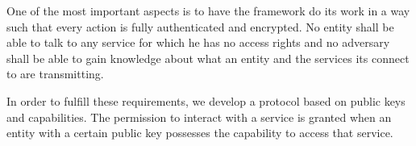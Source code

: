 One of the most important aspects is to have the framework do its work in a way such that every action is fully authenticated and encrypted.
No entity shall be able to talk to any service for which he has no access rights and no adversary shall be able to gain knowledge about what an entity and the services its connect to are transmitting.

In order to fulfill these requirements, we develop a protocol based on public keys and capabilities.
The permission to interact with a service is granted when an entity with a certain public key possesses the capability to access that service.

